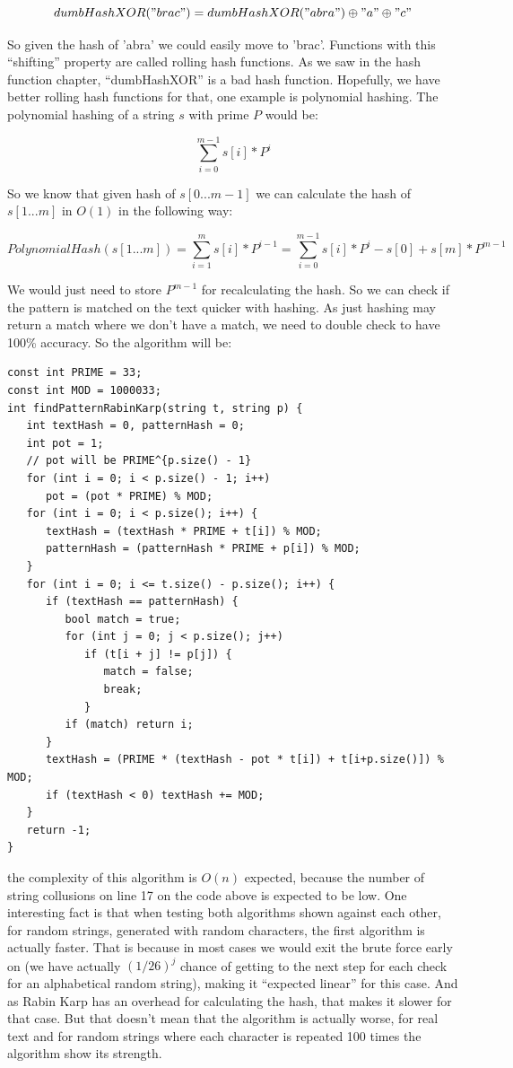 \[ dumbHashXOR("brac") = dumbHashXOR("abra") \oplus "a" \oplus "c" \]

So given the hash of 'abra' we could easily move to 'brac'. Functions with this ``shifting'' property are called rolling hash functions. As we saw in the hash function chapter, ``dumbHashXOR'' is a bad hash function. Hopefully, we have better rolling hash functions for that, one example is polynomial hashing. The polynomial hashing of a string \( s \) with prime \( P \) would be:

\[ \sum_{i=0}^{m-1}s[i]*P^{i} \]

So we know that given hash of \( s[0...m-1] \) we can calculate the hash of \( s[1...m] \) in \( O(1) \) in the following way:

\[ PolynomialHash(s[1...m]) = \sum_{i=1}^{m}s[i]*P^{i-1} = \sum_{i=0}^{m-1}s[i]*P^{i} - s[0] + s[m] * P^{m-1} \]

We would just need to store \( P^{m-1} \) for recalculating the hash. So we can check if the pattern is matched on the text quicker with hashing. As just hashing may return a match where we don't have a match, we need to double check to have 100\% accuracy. So the algorithm will be:

\begin{lstlisting}
const int PRIME = 33;
const int MOD = 1000033;
int findPatternRabinKarp(string t, string p) {
   int textHash = 0, patternHash = 0;
   int pot = 1;
   // pot will be PRIME^{p.size() - 1}
   for (int i = 0; i < p.size() - 1; i++)
      pot = (pot * PRIME) % MOD;
   for (int i = 0; i < p.size(); i++) {
      textHash = (textHash * PRIME + t[i]) % MOD;
      patternHash = (patternHash * PRIME + p[i]) % MOD;
   }
   for (int i = 0; i <= t.size() - p.size(); i++) {
      if (textHash == patternHash) {
         bool match = true;
         for (int j = 0; j < p.size(); j++)
            if (t[i + j] != p[j]) {
               match = false;
               break;
            }
         if (match) return i;
      }
      textHash = (PRIME * (textHash - pot * t[i]) + t[i+p.size()]) % MOD;
      if (textHash < 0) textHash += MOD;
   }
   return -1;
}
\end{lstlisting}

the complexity of this algorithm is \( O(n) \) expected, because the number of string collusions on line 17 on the code above is expected to be low. One interesting fact is that when testing both algorithms shown against each other, for random strings, generated with random characters, the first algorithm is actually faster. That is because in most cases we would exit the brute force early on (we have actually \( (1/26)^j \) chance of getting to the next step for each check for an alphabetical random string), making it ``expected linear'' for this case. And as Rabin Karp has an overhead for calculating the hash, that makes it slower for that case. But that doesn't mean that the algorithm is actually worse, for real text and for random strings where each character is repeated 100 times the algorithm show its strength.

